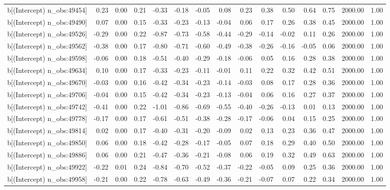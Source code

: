 \begin{table}[ht]
\begin{tabular}{rrrrrrrrrrrrrrr}
  b[(Intercept) n\_obs:49454] & 0.23 & 0.00 & 0.21 & -0.33 & -0.18 & -0.05 & 0.08 & 0.23 & 0.38 & 0.50 & 0.64 & 0.75 & 2000.00 & 1.00 \\ 
  b[(Intercept) n\_obs:49490] & 0.07 & 0.00 & 0.15 & -0.33 & -0.23 & -0.13 & -0.04 & 0.06 & 0.17 & 0.26 & 0.38 & 0.45 & 2000.00 & 1.00 \\ 
  b[(Intercept) n\_obs:49526] & -0.29 & 0.00 & 0.22 & -0.87 & -0.73 & -0.58 & -0.44 & -0.29 & -0.14 & -0.02 & 0.11 & 0.26 & 2000.00 & 1.00 \\ 
  b[(Intercept) n\_obs:49562] & -0.38 & 0.00 & 0.17 & -0.80 & -0.71 & -0.60 & -0.49 & -0.38 & -0.26 & -0.16 & -0.05 & 0.06 & 2000.00 & 1.00 \\ 
  b[(Intercept) n\_obs:49598] & -0.06 & 0.00 & 0.18 & -0.51 & -0.40 & -0.29 & -0.18 & -0.06 & 0.05 & 0.16 & 0.28 & 0.38 & 2000.00 & 1.00 \\ 
  b[(Intercept) n\_obs:49634] & 0.10 & 0.00 & 0.17 & -0.33 & -0.23 & -0.11 & -0.01 & 0.11 & 0.22 & 0.32 & 0.42 & 0.51 & 2000.00 & 1.00 \\ 
  b[(Intercept) n\_obs:49670] & -0.03 & 0.00 & 0.16 & -0.42 & -0.34 & -0.23 & -0.14 & -0.03 & 0.08 & 0.17 & 0.28 & 0.36 & 2000.00 & 1.00 \\ 
  b[(Intercept) n\_obs:49706] & -0.04 & 0.00 & 0.15 & -0.42 & -0.34 & -0.23 & -0.13 & -0.04 & 0.06 & 0.16 & 0.27 & 0.37 & 2000.00 & 1.00 \\ 
  b[(Intercept) n\_obs:49742] & -0.41 & 0.00 & 0.22 & -1.01 & -0.86 & -0.69 & -0.55 & -0.40 & -0.26 & -0.13 & 0.01 & 0.13 & 2000.00 & 1.00 \\ 
  b[(Intercept) n\_obs:49778] & -0.17 & 0.00 & 0.17 & -0.61 & -0.51 & -0.38 & -0.28 & -0.17 & -0.06 & 0.04 & 0.15 & 0.25 & 2000.00 & 1.00 \\ 
  b[(Intercept) n\_obs:49814] & 0.02 & 0.00 & 0.17 & -0.40 & -0.31 & -0.20 & -0.09 & 0.02 & 0.13 & 0.23 & 0.36 & 0.47 & 2000.00 & 1.00 \\ 
  b[(Intercept) n\_obs:49850] & 0.06 & 0.00 & 0.18 & -0.42 & -0.28 & -0.17 & -0.05 & 0.07 & 0.18 & 0.29 & 0.40 & 0.50 & 2000.00 & 1.00 \\ 
  b[(Intercept) n\_obs:49886] & 0.06 & 0.00 & 0.21 & -0.47 & -0.36 & -0.21 & -0.08 & 0.06 & 0.19 & 0.32 & 0.49 & 0.63 & 2000.00 & 1.00 \\ 
  b[(Intercept) n\_obs:49922] & -0.22 & 0.01 & 0.24 & -0.84 & -0.70 & -0.52 & -0.37 & -0.22 & -0.05 & 0.09 & 0.25 & 0.36 & 2000.00 & 1.00 \\ 
  b[(Intercept) n\_obs:49958] & -0.21 & 0.00 & 0.22 & -0.78 & -0.63 & -0.49 & -0.36 & -0.21 & -0.07 & 0.07 & 0.22 & 0.34 & 2000.00 & 1.00 \\ 

\end{tabular}
\end{table}
